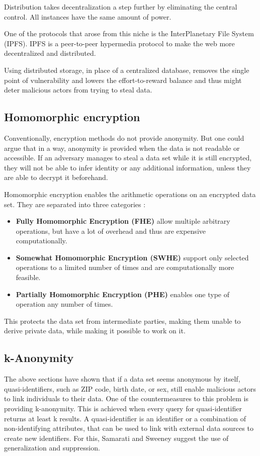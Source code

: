 Distribution takes decentralization a step further by eliminating the central control. All instances have the same amount of power.

One of the protocols that arose from this niche is the InterPlanetary File System (IPFS)\cite{DBLP:journals/corr/Benet14}. IPFS is a peer-to-peer hypermedia protocol to make the web more decentralized and distributed.


Using distributed storage, in place of a centralized database, removes the single point of vulnerability and lowers the effort-to-reward balance and thus might deter malicious actors from trying to steal data.

\subsection{Homomorphic encryption}
Conventionally, encryption methods do not provide anonymity. But one could argue that in a way, anonymity is provided when the data is not readable or accessible. If an adversary manages to steal a data set while it is still encrypted, they will not be able to infer identity or any additional information, unless they are able to decrypt it beforehand. 

Homomorphic encryption enables the arithmetic operations on an encrypted data set. They are separated into three categories \cite{DBLP:journals/corr/abs-1812-02428}:
\begin{itemize}
    \item \textbf{Fully Homomorphic Encryption (FHE)} allow multiple arbitrary operations, but have a lot of overhead and thus are expensive computationally.
    \item \textbf{Somewhat Homomorphic Encryption (SWHE)} support only selected operations to a limited number of times and are computationally more feasible.
    \item \textbf{Partially Homomorphic Encryption (PHE)} enables one type of operation any number of times.
\end{itemize}

This protects the data set from intermediate parties, making them unable to derive private data, while making it possible to work on it.

\subsection{k-Anonymity}
The above sections have shown that if a data set seems anonymous by itself, quasi-identifiers, such as ZIP code, birth date, or sex, still enable malicious actors to link individuals to their data. One of the countermeasures to this problem is providing k-anonymity. This is achieved when every query for quasi-identifier returns at least k results. A quasi-identifier is an identifier or a combination of non-identifying attributes, that can be used to link with external data sources to create new identifiers. For this, Samarati \cite{samarati} and Sweeney \cite{DBLP:journals/ijufks/Sweene02} suggest the use of generalization and suppression.

